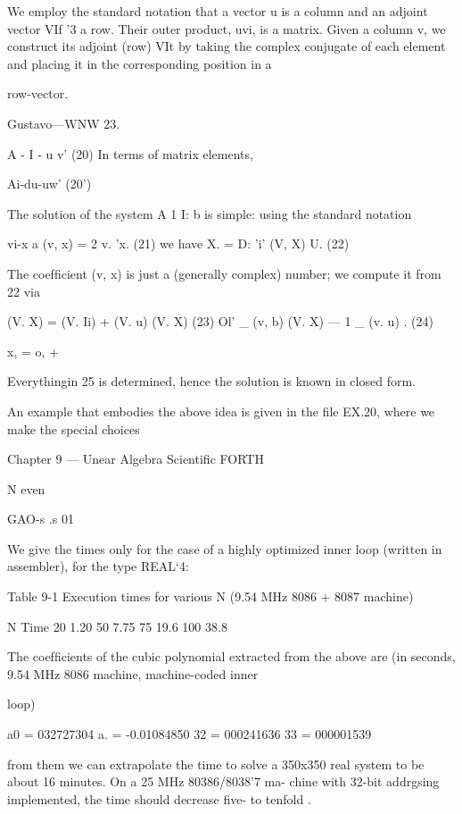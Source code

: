 {{{{{{{{{{{We employ the standard notation that a vector u is a column and an adjoint vector VIf '3 a row.
Their outer product, uvi, is a matrix. Given a column v, we construct its adjoint (row) VIt by
taking the complex conjugate of each element and placing it in the corresponding position in a

row-vector.

Gustavo—WNW 23.

A - I - u v' (20)
In terms of matrix elements,

Ai-du-uw' (20’)

The solution of the system A 1 I: b is simple: using the standard
notation

vi-x a (v, x) = 2 v. 'x. (21)
we have
X. = D: 'i' (V, X) U. (22)

The coefﬁcient (v, x) is just a (generally complex) number; we
compute it from 22 via

(V. X) = (V. Ii) + (V. u) (V. X) (23)
Ol’
_ (v, b)
(V. X) — 1 _ (v. u) . (24)

x, = o, + %

Everythingin 25 is determined, hence the solution is known in
closed form.

An example that embodies the above idea is given in the ﬁle
EX.20, where we make the special choices

Chapter 9 — Unear Algebra Scientiﬁc FORTH

N even

GAO-s
.s
01

We give the times only for the case of a highly optimized inner
loop (written in assembler), for the type REAL‘4:

 

Table 9-1 Execution times for various N (9.54 MHz 8086 + 8087 machine)

 

N Time
20 1.20
50 7.75
75 19.6
100 38.8

 

 

 

The coefﬁcients of the cubic polynomial extracted from the above
are (in seconds, 9.54 MHz 8086 machine, machine-coded inner

loop)

a0 = 032727304
a. = -0.01084850
32 = 000241636
33 = 000001539

from them we can extrapolate the time to solve a 350x350 real
system to be about 16 minutes. On a 25 MHz 80386/8038’7 ma-
chine with 32-bit addrgsing implemented, the time should
decrease ﬁve- to tenfold .

}}}}}}}}}}}
